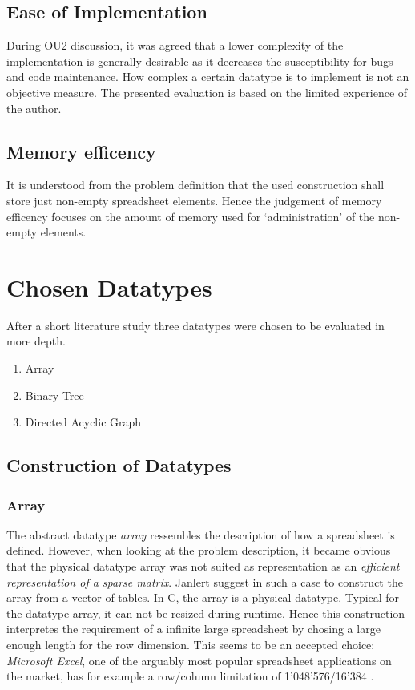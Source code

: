\documentclass[a4paper,11pt,twoside]{article}
\begin{document}
\subsection{Ease of Implementation}
During OU2 discussion, it was agreed that a lower complexity
of the implementation is generally desirable as it decreases the
susceptibility for bugs and code maintenance. How complex a certain
datatype is to implement is not an objective measure. The presented
evaluation is based on the limited experience of the author. 




\subsection{Memory efficency}
It is understood from the problem definition that the used
construction shall store just non-empty spreadsheet elements. Hence
the judgement of memory efficency focuses on the amount of
memory used for `administration' of the non-empty elements.

\section{Chosen Datatypes}
After a short literature study three datatypes were chosen to be
evaluated in more depth.

\begin{enumerate}
\item Array
\item Binary Tree
\item Directed Acyclic Graph
\end{enumerate}

\subsection{Construction of Datatypes}
\subsubsection{Array}
The abstract datatype \emph{array} ressembles the description of 
how a spreadsheet is defined. However, when looking at the problem 
description, it became obvious that the physical datatype array was 
not suited as representation as an \emph{efficient representation of a
 sparse matrix}. Janlert \cite[pp 101-103]{janlert2000} suggest in
such a case to construct the array from a vector of tables. In C, the
array is a physical datatype. Typical for the datatype array, it can
not be resized during runtime. Hence this construction interpretes the
requirement of a infinite large spreadsheet by chosing a large enough
length for the row dimension. This seems to be an accepted choice:
\textit{Microsoft Excel}, one of the arguably most popular spreadsheet
applications on the market, has for example a row/column limitation of
1'048'576/16'384 \cite{excel_limit}.
\end{document}
